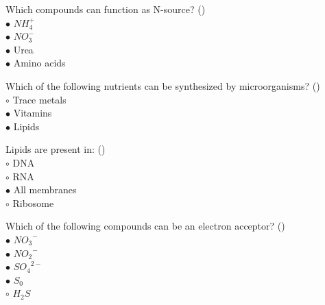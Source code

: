 \documentclass[]{beamer}
\begin{document}
\begin{frame}[shrink] {}
\addtocounter{answers}{1}
\color{blue}
Which compounds can function as N-source?   ()\\
\color{black}
\setlength{\parindent}{-0.4cm}
{\color{red}$\bullet$} $NH_{4}^{+}$ \\
{\color{red}$\bullet$} $NO_{3}^{-}$ \\
{\color{red}$\bullet$} Urea\\
{\color{red}$\bullet$} Amino acids\\
\end{frame}

\begin{frame}[shrink] {}
\addtocounter{answers}{1}
\color{blue}
Which of the following nutrients can be synthesized by microorganisms?   ()\\
\color{black}
\setlength{\parindent}{-0.4cm}
{\color{red}$\circ$}  Trace metals\\
{\color{red}$\bullet$} Vitamins\\
{\color{red}$\bullet$} Lipids \\
\end{frame}

\begin{frame}[shrink] {}
\addtocounter{answers}{1}
\color{blue}
Lipids are present in:   ()\\
\color{black}
\setlength{\parindent}{-0.4cm}
{\color{red}$\circ$} DNA\\
{\color{red}$\circ$} RNA\\
{\color{red}$\bullet$} All membranes\\
{\color{red}$\circ$} Ribosome \\
\end{frame}

\begin{frame}[shrink] {}
\addtocounter{answers}{1}
\color{blue}
Which of the following compounds can be an electron acceptor?   ()\\
\color{black}
\setlength{\parindent}{-0.4cm}
{\color{red}$\bullet$}  ${NO_{3}}^{-}$\\
{\color{red}$\bullet$} ${NO_{2}}^{-}$\\
{\color{red}$\bullet$} ${SO_{4}}^{2-}$\\
{\color{red}$\bullet$} $S_0$\\
{\color{red}$\circ$} $H_{2}S$ \\
\end{frame}
\end{document}
